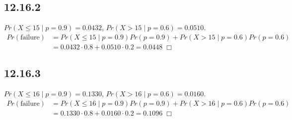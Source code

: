 \documentclass{article}
\begin{document}
\subsection*{12.16.2}
$Pr(X \leqslant 15 \;|\; p = 0.9) = 0.0432$, $Pr(X > 15 \;|\; p = 0.6) = 0.0510$.
\begin{equation*}
\begin{split}
  Pr(\text{failure}) &= Pr(X \leqslant 15 \;|\; p = 0.9) Pr(p = 0.9) + Pr(X > 15 \;|\; p = 0.6) Pr(p = 0.6)\\
  &= 0.0432\cdot 0.8 + 0.0510\cdot 0.2 = 0.0448 \;\Box
\end{split}
\end{equation*}
\subsection*{12.16.3}
$Pr(X \leqslant 16 \;|\; p = 0.9) = 0.1330$, $Pr(X > 16 \;|\; p = 0.6) = 0.0160$.
\begin{equation*}
\begin{split}
  Pr(\text{failure}) &= Pr(X \leqslant 16 \;|\; p = 0.9) Pr(p = 0.9) + Pr(X > 16 \;|\; p = 0.6) Pr(p = 0.6)\\
  &= 0.1330\cdot 0.8 + 0.0160\cdot 0.2 = 0.1096 \;\Box
\end{split}
\end{equation*}
\end{document}
